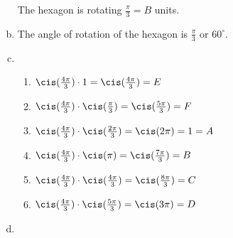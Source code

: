 \begin{enumerate}[(a)]
\begin{figure}[H]
\begin{center}
\end{center}
\end{figure}
The hexagon is rotating $\frac{\pi}{3}=B$ units.\\
 
\item
The angle of rotation of the hexagon is $\frac{\pi}{3}$ or $60^{\circ}$.\\

\item
	\begin{enumerate}[(1)]
	\item
	$\cis(\frac{4\pi}{3})\cdot 1 = \cis(\frac{4\pi}{3}) = E$

	\item
	$\cis(\frac{4\pi}{3})\cdot \cis(\frac{\pi}{3}) = \cis(\frac{5\pi}{3}) = F$

	\item
	$\cis(\frac{4\pi}{3})\cdot \cis(\frac{2\pi}{3}) = \cis(2\pi) = 1 = A$

	\item
	$\cis(\frac{4\pi}{3})\cdot \cis(\pi) = \cis(\frac{7\pi}{3}) = B$ 

	\item
	$\cis(\frac{4\pi}{3})\cdot \cis(\frac{4\pi}{3}) = \cis(\frac{8\pi}{3}) = C$

	\item
	$\cis(\frac{4\pi}{3})\cdot \cis(\frac{5\pi}{3}) = \cis(3\pi) = D$
	\end{enumerate}

\item 
\begin{figure}[H]
\begin{center}
\begin{tikzpicture}[scale=1]


\end{tikzpicture}
\end{center}
\end{figure}
\end{enumerate}
